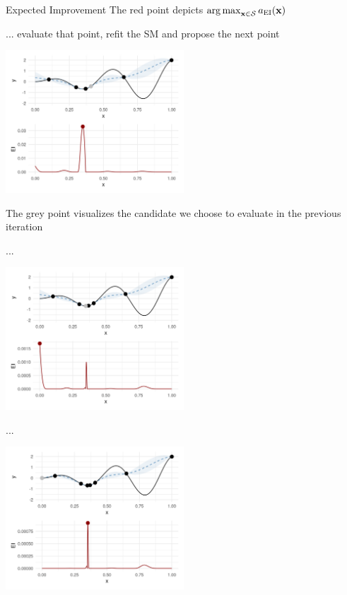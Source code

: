 \documentclass[11pt,compress,t,notes=noshow, xcolor=table]{beamer}
\begin{document}
\begin{vbframe}{Expected Improvement}
The red point depicts $\operatorname{arg\,max}_{\mathbf{x} \in \mathcal{S}} a_{\text{EI}}(\mathbf{x})$

\framebreak

... evaluate that point, refit the SM and propose the next point

\begin{center}
  \includegraphics[width = 0.5\textwidth]{figure_man/bayesian_loop_2.png}
\end{center}

The grey point visualizes the candidate we choose to evaluate in the previous iteration

\framebreak

...

\begin{center}
  \includegraphics[width = 0.5\textwidth]{figure_man/bayesian_loop_3.png}
\end{center}

\framebreak

...

\begin{center}
  \includegraphics[width = 0.5\textwidth]{figure_man/bayesian_loop_4.png}
\end{center}


\end{vbframe}
\end{document}
